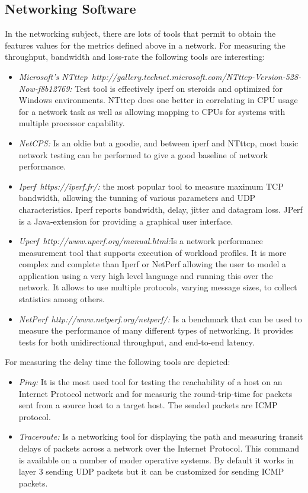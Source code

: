 \subsection{Networking Software}

In the networking subject, there are lots of tools that permit to obtain the
features values for the metrics defined above in a network. 
For measuring the throughput, bandwidth and loss-rate the following tools are interesting:

\begin{itemize}
\item \emph{Microsoft's NTttcp~{http://gallery.technet.microsoft.com/NTttcp-Version-528-Now-f8b12769}:} Test tool is effectively iperf on steroids and
  optimized for Windows environments. NTttcp does one better in correlating in
  CPU usage for a network task as well as allowing mapping to CPUs for systems
  with multiple processor capability. 
\item \emph{NetCPS:} Is an oldie but a goodie, and between iperf and NTttcp,
  most basic network testing can be performed to give a good baseline of network
  performance.
\item \emph{Iperf~{https://iperf.fr/}:} the most popular tool to measure maximum TCP bandwidth, allowing the
  tunning of various parameters and UDP characteristics. Iperf reports
  bandwidth, delay, jitter and datagram loss. JPerf is a Java-extension for
  providing a graphical user interface.
\item \emph{Uperf~{http://www.uperf.org/manual.html}:}Is a network
  performance measurement tool that supports execution of workload profiles. It
  is more complex and complete than Iperf or NetPerf allowing the user to model
  a application using a very high level language and running this over the
  network. It allows to use multiple protocols, varying message sizes, to
  collect statistics among others.
\item \emph{NetPerf~{http://www.netperf.org/netperf/}:} Is a benchmark that can be used to measure the performance of many different types of networking. It provides tests for both unidirectional throughput, and end-to-end latency.
\end{itemize}

For measuring the delay time the following tools are depicted:
\begin{itemize}
\item \emph{Ping:} It is the most used tool for testing the reachability of a host on an
  Internet Protocol network and for measurig the round-trip-time for packets sent
  from a source host to a target host. The sended packets are \ac{ICMP} protocol.
\item \emph{Traceroute:} Is a networking tool for displaying the path and
  measuring transit delays of packets across a network over the Internet
  Protocol. This command is available on a number of moder operative systems. By
  default it works in layer 3 sending \ac{UDP} packets but it can be customized
  for sending \ac{ICMP} packets.
\end{itemize}

